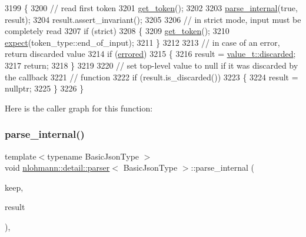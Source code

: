 \begin{DoxyCode}
3199     \{
3200         \textcolor{comment}{// read first token}
3201         \hyperlink{classnlohmann_1_1detail_1_1parser_a33f3859d0dd402445b5859070fd24bab}{get\_token}();
3202 
3203         \hyperlink{classnlohmann_1_1detail_1_1parser_ace714b4bfb791f97050e0b380d2b50c3}{parse\_internal}(\textcolor{keyword}{true}, result);
3204         result.assert\_invariant();
3205 
3206         \textcolor{comment}{// in strict mode, input must be completely read}
3207         \textcolor{keywordflow}{if} (strict)
3208         \{
3209             \hyperlink{classnlohmann_1_1detail_1_1parser_a33f3859d0dd402445b5859070fd24bab}{get\_token}();
3210             \hyperlink{classnlohmann_1_1detail_1_1parser_a9abcc7b005c70ee67ce669c398273516}{expect}(token\_type::end\_of\_input);
3211         \}
3212 
3213         \textcolor{comment}{// in case of an error, return discarded value}
3214         \textcolor{keywordflow}{if} (\hyperlink{classnlohmann_1_1detail_1_1parser_af6a116454a868ebb6628c6137c3dd77d}{errored})
3215         \{
3216             result = \hyperlink{namespacenlohmann_1_1detail_a1ed8fc6239da25abcaf681d30ace4985a94708897ec9db8647dfe695714c98e46}{value\_t::discarded};
3217             \textcolor{keywordflow}{return};
3218         \}
3219 
3220         \textcolor{comment}{// set top-level value to null if it was discarded by the callback}
3221         \textcolor{comment}{// function}
3222         \textcolor{keywordflow}{if} (result.is\_discarded())
3223         \{
3224             result = \textcolor{keyword}{nullptr};
3225         \}
3226     \}
\end{DoxyCode}
Here is the caller graph for this function\+:
\mbox{\label{classnlohmann_1_1detail_1_1parser_ace714b4bfb791f97050e0b380d2b50c3}} 
\subsubsection{\texorpdfstring{parse\+\_\+internal()}{parse\_internal()}}
{\footnotesize\ttfamily template$<$typename Basic\+Json\+Type $>$ \\
void \hyperlink{classnlohmann_1_1detail_1_1parser}{nlohmann\+::detail\+::parser}$<$ Basic\+Json\+Type $>$\+::parse\+\_\+internal (\begin{DoxyParamCaption}\item[{bool}]{keep,  }\item[{Basic\+Json\+Type \&}]{result }\end{DoxyParamCaption})\hspace{0.3cm}{\ttfamily [inline]}, {\ttfamily [private]}}



